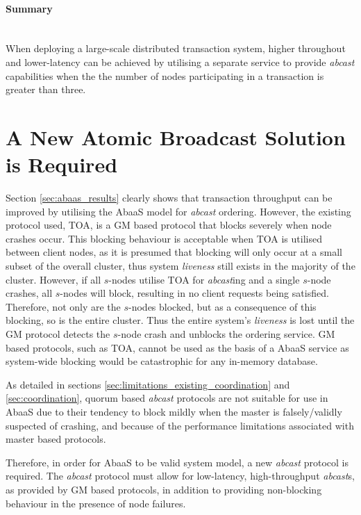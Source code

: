 \paragraph{Summary} \hspace{0pt} \\
When deploying a large-scale distributed transaction system, higher throughout and lower-latency can be achieved by utilising a separate service to provide \emph{abcast} capabilities when the the number of nodes participating in a transaction is greater than three.  

\section{A New Atomic Broadcast Solution is Required}
Section \ref{sec:abaas_results} clearly shows that transaction throughput can be improved by utilising the \textsf{AbaaS} model for \emph{abcast} ordering.  However, the existing protocol used, TOA, is a GM based protocol that blocks severely when node crashes occur.  This blocking behaviour is acceptable when TOA is utilised between client nodes, as it is presumed that blocking will only occur at a small subset of the overall cluster, thus system \emph{liveness} still exists in the majority of the cluster.  However, if all $s$-nodes utilise TOA for \emph{abcast}ing and a single $s$-node crashes, all $s$-nodes will block, resulting in no client requests being satisfied. Therefore, not only are the $s$-nodes blocked, but as a consequence of this blocking, so is the entire cluster.  Thus the entire system's \emph{liveness} is lost until the GM protocol detects the $s$-node crash and unblocks the ordering service.  GM based protocols, such as TOA, cannot be used as the basis of a \textsf{AbaaS} service as system-wide blocking would be catastrophic for any in-memory database.  

As detailed in sections \ref{sec:limitations_existing_coordination} and \ref{sec:coordination}, quorum based \emph{abcast} protocols are not suitable for use in \textsf{AbaaS} due to their tendency to block mildly when the master is falsely/validly suspected of crashing, and because of the performance limitations associated with master based protocols.  

Therefore, in order for \textsf{AbaaS} to be valid system model, a new \emph{abcast} protocol is required.  The \emph{abcast} protocol must allow for low-latency, high-throughput \emph{abcast}s, as provided by GM based protocols, in addition to providing non-blocking behaviour in the presence of node failures.  

